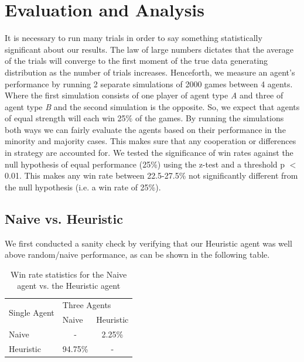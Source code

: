 \documentclass[msc, ai, logo, twoside, notimes, parskip, leftchapter, normalheadings]{infthesis}
\begin{document}
\chapter{Evaluation and Analysis}
It is necessary to run many trials in order to say something statistically significant about our results. The law of large numbers dictates that the average of the trials will converge to the first moment of the true data generating distribution as the number of trials increases. Henceforth, we measure an agent's performance by running 2 separate simulations of 2000 games between 4 agents. Where the first simulation consists of one player of agent type \textit{A} and three of agent type \textit{B} and the second simulation is the opposite. So, we expect that agents of equal strength will each win 25\% of the games. By running the simulations both ways we can fairly evaluate the agents based on their performance in the minority and majority cases. This makes sure that any cooperation or differences in strategy are accounted for. We tested the significance of win rates against the null hypothesis of equal performance (25\%) using the z-test and a threshold p \(<\) 0.01. This makes any win rate between 22.5-27.5\% not significantly different from the null hypothesis (i.e. a win rate of 25\%).

\section{Naive vs. Heuristic}
We first conducted a sanity check by verifying that our Heuristic agent was well above random/naive performance, as can be shown in the following table. 

\begin{table}[h!]
\centering
\caption{Win rate statistics for the Naive agent vs. the Heuristic agent}
\begin{tabular}{l|llll}
\multirow{2}{*}{Single Agent} & \multicolumn{4}{l}{Three Agents} \\ \cline{2-5} 
& \multicolumn{2}{l|}{Naive} & \multicolumn{2}{l}{Heuristic} \\ \hline \hline
Naive & \multicolumn{2}{c}{-} & \multicolumn{2}{c}{2.25\%} \\
Heuristic & \multicolumn{2}{c}{94.75\%} & \multicolumn{2}{c}{-} 
\end{tabular}
\end{table}
\end{document}
